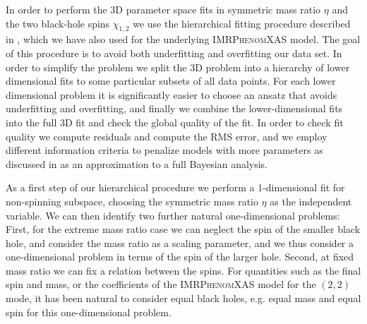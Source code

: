 \documentclass[twocolumn,prd,aps,superscriptaddress,preprintnumbers,tightenlines,showpacs,nofootinbib,eqsecnum,amsfonts,amsmath]{revtex4}
\newcommand{\phX}{\textsc{IMRPhenomXAS}\xspace}
\begin{document}
In order to perform the 3D parameter space fits in symmetric mass ratio $\eta$ and the two black-hole spins $\chi_{1,2}$ we use the hierarchical fitting procedure described in \cite{Jimenez-Forteza:2016oae}, which we have also used for the underlying \phX model.
The goal of this procedure is to avoid both underfitting
and overfitting our data set. In order to simplify the problem we split the 3D problem into a hierarchy of 
 lower dimensional fits to some particular subsets of all data points. For each lower dimensional problem it is significantly easier to choose an ansatz that avoids  underfitting and overfitting, and finally we combine the lower-dimensional fits into the full 3D fit and check the global quality of the fit. In order to check fit quality we compute residuals and compute the RMS error, 
 and we employ different information criteria to penalize models with more parameters
 as discussed in \cite{Jimenez-Forteza:2016oae} as an approximation to a full Bayesian analysis.
 
 As a first step of our hierarchical procedure we perform a 1-dimensional fit for non-spinning subspace, choosing the symmetric mass ratio $\eta$ as the independent variable.
 We can then identify two further natural one-dimensional problems: First, for the extreme mass ratio case we can neglect the spin of the smaller black hole, and consider the mass ratio as a scaling parameter, and we thus consider a one-dimensional problem in terms of the spin of the larger hole. Second, at fixed mass ratio we can fix a relation between the spins. For quantities such as the final spin and mass, or the coefficients of the \phX model for the $(2,2)$ mode, it has been natural to consider equal black holes, e.g. equal mass and equal spin for this one-dimensional problem.
 
\end{document}
